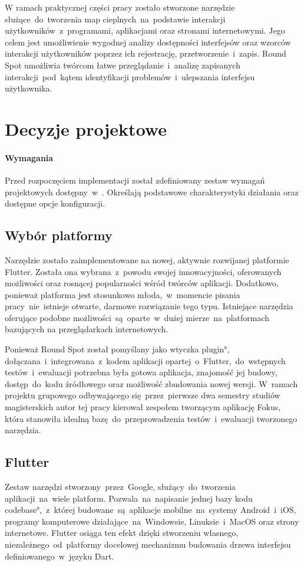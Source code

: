 W ramach praktycznej części pracy zostało stworzone narzędzie służące~do~tworzenia map cieplnych~na~podstawie interakcji użytkowników~z~programami, aplikacjami oraz stronami internetowymi. Jego celem jest umożliwienie wygodnej analizy dostępności interfejsów oraz wzorców interakcji użytkowników poprzez ich rejestrację, przetworzenie~i~zapis. Round Spot umożliwia twórcom łatwe przeglądanie~i~analizę zapisanych interakcji~pod~kątem identyfikacji problemów~i~ulepszania interfejsu użytkownika.

\section{Decyzje projektowe}

\paragraph{Wymagania} Przed rozpoczęciem implementacji został zdefiniowany zestaw wymagań projektowych dostępny~w~. Określają podstawowe charakterystyki działania oraz dostępne opcje konfiguracji.

\subsection{Wybór platformy}
Narzędzie zostało zaimplementowane na nowej, aktywnie rozwijanej platformie Flutter. Została ona wybrana~z~powodu swojej innowacyjności, oferowanych możliwości oraz rosnącej popularności wśród twórców aplikacji. Dodatkowo, ponieważ platforma jest stosunkowo młoda,~w~momencie pisania pracy~nie~istnieje otwarte, darmowe rozwiązanie tego typu. Istniejące narzędzia oferujące podobne możliwości~są~oparte~w~dużej mierze~na~platformach bazujących na przeglądarkach internetowych.

Ponieważ Round Spot został pomyślany jako wtyczka \ang{plugin}, dołączana~i~integrowana~z~kodem aplikacji opartej~o~Flutter,~do~wstępnych testów~i~ewaluacji potrzebna była gotowa aplikacja, znajomość jej budowy, dostęp~do~kodu źródłowego oraz możliwość zbudowania nowej wersji. W~ramach projektu grupowego odbywającego się~przez~pierwsze dwa semestry studiów magisterskich autor tej pracy kierował zespołem tworzącym aplikację Fokus, która stanowiła idealną bazę~do~przeprowadzenia testów~i~ewaluacji tworzonego narzędzia.

\subsection{Flutter}
Zestaw narzędzi stworzony~przez~Google, służący~do~tworzenia aplikacji~na~wiele platform. Pozwala~na~napisanie jednej bazy kodu \ang{codebase},~z~której budowane~są~aplikacje mobilne~na~systemy Android~i~iOS, programy komputerowe działające~na~Windowsie, Linuksie~i~MacOS oraz strony internetowe. Flutter osiąga ten efekt dzięki stworzeniu własnego, niezależnego~od~platformy docelowej mechanizmu budowania drzewa interfejsu definiowanego~w~języku Dart. 

